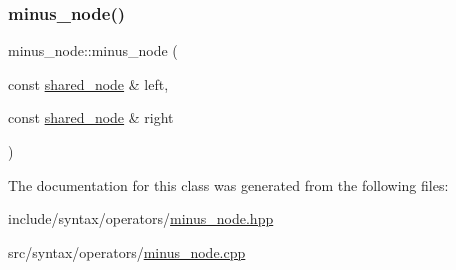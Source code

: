 \subsubsection{\texorpdfstring{minus\+\_\+node()}{minus\_node()}}
{\footnotesize\ttfamily minus\+\_\+node\+::minus\+\_\+node (\begin{DoxyParamCaption}\item[{const \hyperlink{namespacejawe_a3f307481d921b6cbb50cc8511fc2b544}{shared\+\_\+node} \&}]{left,  }\item[{const \hyperlink{namespacejawe_a3f307481d921b6cbb50cc8511fc2b544}{shared\+\_\+node} \&}]{right }\end{DoxyParamCaption})}



The documentation for this class was generated from the following files\+:\begin{DoxyCompactItemize}
\item 
include/syntax/operators/\hyperlink{minus__node_8hpp}{minus\+\_\+node.\+hpp}\item 
src/syntax/operators/\hyperlink{minus__node_8cpp}{minus\+\_\+node.\+cpp}\end{DoxyCompactItemize}
